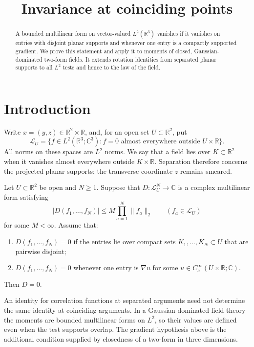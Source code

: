 \documentclass[11pt,letterpaper,reqno]{amsart}
\title{Invariance at coinciding points}
\date{}
\makeatletter
\theoremstyle{definition}
\newcommand{\ms@majorstart}{%
  \pushQED{\qed}\renewcommand{\qedsymbol}{$\blacksquare\square$}}
\newenvironment{theorem}[1][]{\ms@majorstart\ms@theorem[#1]}
  {\popQED\endms@theorem}
\theoremstyle{remark}
\newcommand{\R}{\mathbb R}
\newcommand{\C}{\mathbb C}
\makeatother
\begin{document}
\begin{abstract}
A bounded multilinear form on vector-valued \(L^2(\R^3)\) vanishes
if it vanishes on entries with disjoint planar supports and whenever
one entry is a compactly supported gradient. We prove this statement
and apply it to moments of closed, Gaussian-dominated two-form fields.
It extends rotation identities from separated planar supports to all
\(L^2\) tests and hence to the law of the field.
\end{abstract}
\maketitle
\tableofcontents

\section{Introduction}\label{sec:introduction}
Write $x=(y,z)\in\R^2\times\R$, and, for an open set $U\subset\R^2$, put
\[
 \mathcal L_U=\{f\in L^2(\R^3;\C^3):
       f=0\text{ almost everywhere outside }U\times\R\}.
\]
All norms on these spaces are $L^2$ norms. We say that a field lies over
$K\subset\R^2$ when it vanishes almost everywhere outside $K\times\R$.
Separation therefore concerns the projected planar supports; the
transverse coordinate $z$ remains smeared.

\begin{theorem}[Absence of contact terms]\label{thm:contact}
Let $U\subset\R^2$ be open and $N\ge1$. Suppose that
$D\colon\mathcal L_U^N\to\C$ is a complex multilinear form satisfying
\[
 |D(f_1,\ldots,f_N)|\le M\prod_{a=1}^N\|f_a\|_2
       \qquad(f_a\in\mathcal L_U)
\]
for some $M<\infty$. Assume that:
\begin{enumerate}[label=\textup{(\roman*)}]
\item $D(f_1,\ldots,f_N)=0$ if the entries lie over compact sets
$K_1,\ldots,K_N\subset U$ that are pairwise disjoint;
\item $D(f_1,\ldots,f_N)=0$ whenever one entry is $\nabla u$ for some
$u\in C_c^\infty(U\times\R;\C)$.
\end{enumerate}
Then $D=0$.
\end{theorem}

An identity for correlation functions at separated arguments need not
determine the same identity at coinciding arguments. In a
Gaussian-dominated field theory the moments are bounded multilinear
forms on \(L^2\), so their values are defined even when the test supports
overlap. The gradient hypothesis above is the additional condition
supplied by closedness of a two-form in three dimensions.
\end{document}
